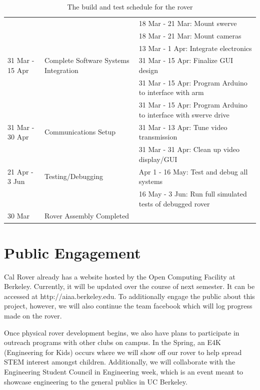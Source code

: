 \documentclass[titlepage,twocolumn,10pt]{article}
\begin{document}
\begin{table}[P]
\begin{tabular*}{\textwidth}{l  l  l}
            & & 18 Mar - 21 Mar: Mount swerve\\
            & & 18 Mar - 21 Mar: Mount cameras\\
            & & 13 Mar - 1 Apr: Integrate electronics\\
            \hline
            31 Mar - 15 Apr & Complete Software Systems Integration & 31 Mar - 15 Apr: Finalize GUI design \\
            & & 31 Mar - 15 Apr: Program Arduino to interface with arm\\
            & & 31 Mar - 15 Apr: Program Arduino to interface with swerve drive\\
            \hline
            31 Mar - 30 Apr & Communications Setup & 31 Mar - 13 Apr: Tune video transmission \\
            & & 31 Mar - 31 Apr: Clean up video display/GUI \\
            \hline
            21 Apr - 3 Jun & Testing/Debugging & Apr 1 - 16 May: Test and debug all systems \\
            & & 16 May - 3 Jun: Run full simulated tests of debugged rover\\
            \hline
            30 Mar & Rover Assembly Completed &  \\
        \end{tabular*}
        \caption{The build and test schedule for the rover}
    \end{table}
    
    \section{Public Engagement}
    Cal Rover already has a website hosted by the Open Computing Facility at Berkeley. Currently, it will be updated over the course of next semester. It can be accessed at http://aiaa.berkeley.edu. To additionally engage the public about this project, however, we will also continue the team facebook which will log progress made on the rover.

    Once physical rover development begins, we also have plans to participate in outreach programs with other clubs on campus. In the Spring, an E4K (Engineering for Kids)  occurs where we will show off our rover to help spread STEM interest amongst children. Additionally, we will collaborate with the Engineering Student Council in Engineering week, which is an event meant to showcase engineering to the general publics in UC Berkeley.
\end{document}
